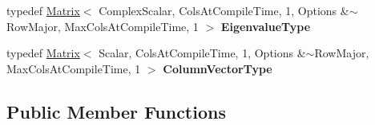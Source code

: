\begin{DoxyCompactItemize}
\item 
\mbox{\label{class_eigen_1_1_real_q_z_afbbe25cec217b5e046a5c30ff5cd06a9}} 
typedef \mbox{\hyperlink{class_eigen_1_1_matrix}{Matrix}}$<$ Complex\+Scalar, Cols\+At\+Compile\+Time, 1, Options \&$\sim$Row\+Major, Max\+Cols\+At\+Compile\+Time, 1 $>$ {\bfseries Eigenvalue\+Type}
\item 
\mbox{\label{class_eigen_1_1_real_q_z_a9881cece39bdf8c3e3cf46358b26dacf}} 
typedef \mbox{\hyperlink{class_eigen_1_1_matrix}{Matrix}}$<$ Scalar, Cols\+At\+Compile\+Time, 1, Options \&$\sim$Row\+Major, Max\+Cols\+At\+Compile\+Time, 1 $>$ {\bfseries Column\+Vector\+Type}
\end{DoxyCompactItemize}
\subsection*{Public Member Functions}
